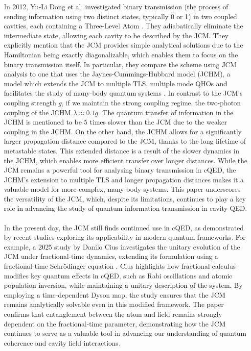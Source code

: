 \documentclass[12pt,a4paper]{article}
\begin{document}
In 2012, Yu-Li Dong et al. investigated binary transmission (the process of sending information using two distinct states, typically 0 or 1) in two coupled cavities, each containing a Three-Level Atom \cite{Context2012-CQED-JCM}. They adiabatically eliminate the intermediate state, allowing each cavity to be described by the JCM. They explicitly mention that the JCM provides simple analytical solutions due to the Hamiltonian being exactly diagonalizable, which enables them to focus on the binary transmission itself. In particular, they compare the scheme using JCM analysis to one that uses the Jaynes-Cummings-Hubbard model (JCHM), a model which extends the JCM to multiple TLS, multiple mode QHOs and facilitates the study of many-body quantum systems \cite{Context2007-JCH_1,Context2006-JCH_2,Context2006-JCH_3}. In contrast to the JCM's coupling strength $g$, if we maintain the strong coupling regime, the two-photon coupling of the JCHM $\lambda\approx0.1g$. The quantum transfer of information in the JCHM is mentioned to be $5$ times slower than the JCM due to the weaker coupling in the JCHM. On the other hand, the JCHM allows for a significantly larger propagation distance compared to the JCM, thanks to the long lifetime of metastable states. This extended distance is a result of the slower dynamics in the JCHM, which enables more efficient transfer over longer distances. While the JCM remains a powerful tool for analysing binary transmission in cQED, the JCHM's extension to multiple TLS and longer propagation distances makes it a valuable model for more complex, many-body systems. This paper underscores the versatility of the JCM, which, despite its limitations, continues to play a key role in advancing the study of quantum information transmission in cavity QED.\\
\\
In the present day, the JCM still finds continued use in cQED, as demonstrated by recent studies exploring its applicability in modern quantum frameworks. For example, a 2025 study by Danilo Cius investigates the unitary evolution of the JCM under fractional-time dynamics, extending its formulation using a fractional-time Schrödinger equation \cite{}. Cius highlights how fractional calculus modifies key quantum effects in cQED, such as Rabi oscillations and atomic population inversion, while maintaining a unitary description of the system. By employing a time-dependent Dyson map, the study ensures that the JCM remains analytically solvable even in this modified framework. The paper confirms that entanglement between the atom and field remains strongly dependent on the fractional-time parameter, demonstrating how the JCM continues to serve as a valuable tool in advancing our understanding of quantum coherence and cavity field interactions.
\end{document}
